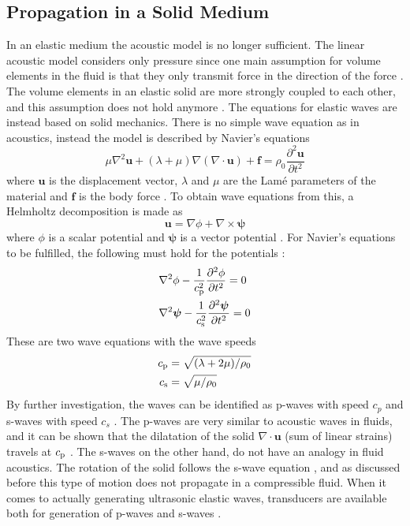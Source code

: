 \documentclass[11pt,twoside]{eitExjobb}
\begin{document}
	\subsection{Propagation in a Solid Medium \label{sec:th-prop-solid}}
	In an elastic medium the acoustic model is no longer sufficient. The linear acoustic model considers only pressure since one main assumption for volume elements in the fluid is that they only transmit force in the direction of the force \cite{Kaufman2000}. The volume elements in an elastic solid are more strongly coupled to each other, and this assumption does not hold anymore \cite{Kaufman2005}. The equations for elastic waves are instead based on solid mechanics. There is no simple wave equation as in acoustics, instead the model is described by Navier's equations
	\begin{equation*}
		\mu \nabla^2 \bm{u} + (\lambda+\mu) \nabla (\nabla \cdot \bm{u}) + \bm{f} = \rho_0 \frac{\partial^2 \bm{u}}{\partial t^2}
	\end{equation*}
	where $\bm{u}$ is the displacement vector, $\lambda$ and $\mu$ are the Lamé parameters of the material and $\bm{f}$ is the body force \cite{Schmerr2016}. To obtain wave equations from this, a Helmholtz decomposition is made as
	\begin{equation*}
		\bm{u} = \nabla \phi + \nabla \times \bm{\psi}
	\end{equation*}
	where $\phi$ is a scalar potential and $\bm{\psi}$ is a vector potential \cite{Schmerr2016}. For Navier's equations to be fulfilled, the following must hold for the potentials \cite{Schmerr2016}:
	\begin{align*}
		&\nabla^2 \phi - \frac{1}{c_{\mathrm{p}}^2} \frac{\partial^2 \phi}{\partial t^2} = 0 \\
		&\nabla^2 \bm{\psi} - \frac{1}{c_{\mathrm{s}}^2} \frac{\partial^2 \bm{\psi}}{\partial t^2} = 0
	\end{align*}
	These are two wave equations with the wave speeds \cite{Schmerr2016}
	\begin{align*}
		c_{\mathrm{p}} &= \sqrt{(\lambda + 2\mu)/\rho_0} \\
		c_{\mathrm{s}} &= \sqrt{\mu/\rho_0}
	\end{align*}
	By further investigation, the waves can be identified as p-waves with speed $c_p$ and s-waves with speed $c_s$ \cite{Schmerr2016}. The p-waves are very similar to acoustic waves in fluids, and it can be shown that the dilatation of the solid $\nabla \cdot \bm{u}$ (sum of linear strains) travels at $c_{\mathrm{p}}$ \cite{Schmerr2016}. The s-waves on the other hand, do not have an analogy in fluid acoustics. The rotation of the solid follows the s-wave equation \cite{Schmerr2016}, and as discussed before this type of motion does not propagate in a compressible fluid. When it comes to actually generating ultrasonic elastic waves, transducers are available both for generation of p-waves and s-waves \cite{Schmerr2016}.
	
\end{document}
